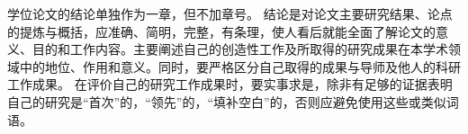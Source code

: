 \begin{conclusion}
学位论文的结论单独作为一章，但不加章号。
结论是对论文主要研究结果、论点的提炼与概括，应准确、简明，完整，有条理，使人看后就能全面了解论文的意义、目的和工作内容。主要阐述自己的创造性工作及所取得的研究成果在本学术领域中的地位、作用和意义。同时，要严格区分自己取得的成果与导师及他人的科研工作成果。
在评价自己的研究工作成果时，要实事求是，除非有足够的证据表明自己的研究是“首次”的，“领先”的，“填补空白”的，否则应避免使用这些或类似词语。
\end{conclusion}
